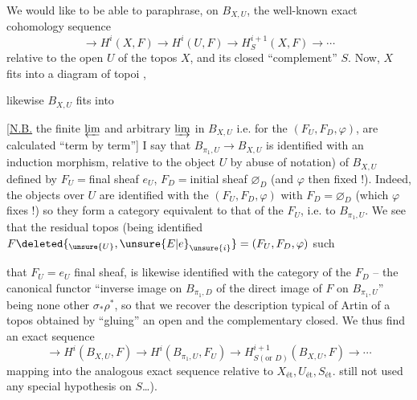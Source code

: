 We would like to be able to paraphrase,
on $B_{X,U}$, the well-known exact
cohomology sequence
\[
\longrightarrow H^i(X,F)\longrightarrow H^i(U,F)
\longrightarrow H^{i+1}_S(X,F)\longrightarrow\cdots
\]
relative to the open $U$ of the topos $X$, and its
closed ``complement'' $S$. Now,  
$X$ fits into a diagram of topoi
,

likewise $B_{X,U}$ fits into

[\uline{N.B.} the finite $\varprojlim$ and arbitrary $\varinjlim$
in $B_{X,U}$ i.e. for the $(F_U,F_D,\varphi)$, are
calculated ``term by term''] I say
that $B_{\pi_1,U}\longrightarrow B_{X,U}$ is identified with an
induction morphism, relative to the
object   $U$ by abuse of notation)
of $B_{X,U}$ defined by
$F_U={}$final sheaf $e_U$, $F_D={}$initial sheaf $\varnothing_D$
(and $\varphi$  then fixed !). Indeed, the
objects  over $U$ are identified with the
$(F_U,F_D,\varphi)$ with $F_D=\varnothing_D$ (which $\varphi$ fixes !) so
they form a category equivalent to that of the
$F_U$, i.e. to $B_{\pi_1,U}$. We see that the residual
topos (being identified   $F\deleted{_{\unsure{U}},\unsure{E|e}_{\unsure{i}}}=(F_U,F_D,\varphi)$ such

that $F_U=e_U$ final sheaf, is likewise identified with the
category  of the $F_D$  -- the
canonical functor ``inverse image on $B_{\pi_1,D}$ of the direct
image of $F$ on $B_{\pi_1,U}$'' being none other
$\sigma_*\rho^*$, so that we recover the description
 typical of Artin of a topos obtained
by ``gluing'' an  open and the
complementary closed.
We thus find an exact sequence
\[
\longrightarrow H^i(B_{X,U},F)\longrightarrow
H^i(B_{\pi_1,U},F_U)\longrightarrow
H^{i+1}_{S(\text{or }D)}(B_{X,U},F)\longrightarrow\cdots
\]
mapping into the analogous exact sequence
relative to $X_{\mathrm{ét}},U_{\mathrm{ét}},S_{\mathrm{ét}}$.  
still not used any special hypothesis on $S$\ldots).


